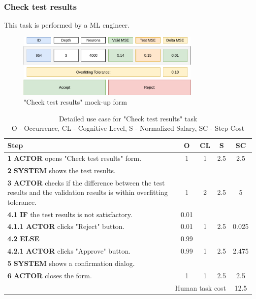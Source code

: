 \subsubsection{Check test results}

This task is performed by a ML engineer.

\begin{figure}[H]
\centering
\includegraphics[width=0.8\textwidth]{figures/check_test_results.pdf}
\caption{"Check test results" mock-up form}
\end{figure}

\begin{table}[H]
\centering
\begin{tabularx}{\textwidth}{|X|c|c|c|c|}
\hline
\textbf{Step} & \textbf{O} & \textbf{CL} & \textbf{S} & \textbf{SC} \\
\hline
\textbf{1} \textbf{ACTOR} opens "Check test results" form. & 1 & 1 & 2.5 & 2.5 \\
\hline
\textbf{2} \textbf{SYSTEM} shows the test results. & & & & \\
\hline
\textbf{3} \textbf{ACTOR} checks if the difference between the test results and the validation results is within overfitting tolerance. & 1 & 2 & 2.5 & 5 \\
\hline
\textbf{4.1} \textbf{IF} the test results is not satisfactory. & 0.01 & & & \\
\hline
\textbf{4.1.1} \textbf{ACTOR} clicks "Reject" button. & 0.01 & 1 & 2.5 & 0.025 \\
\hline
\textbf{4.2} \textbf{ELSE} & 0.99 & & & \\
\hline
\textbf{4.2.1} \textbf{ACTOR} clicks "Approve" button. & 0.99 & 1 & 2.5 & 2.475 \\
\hline
\textbf{5} \textbf{SYSTEM} shows a confirmation dialog. & & & & \\
\hline
\textbf{6} \textbf{ACTOR} closes the form. & 1 & 1 & 2.5 & 2.5 \\
\hline
\multicolumn{4}{|r|}{Human task cost} & 12.5 \\
\hline
\end{tabularx}
\caption{Detailed use case for "Check test results" task\\ 
O - Occurrence, CL - Cognitive Level, S - Normalized Salary, SC - Step Cost}
\label{table:check_test_results}
\end{table}


